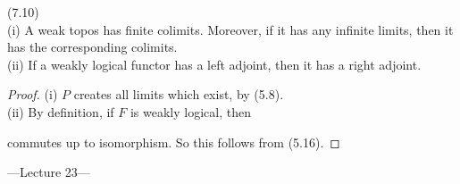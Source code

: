 \documentclass[a4paper]{article}
\begin{document}
\begin{coro} (7.10)\\
    (i) A weak topos has finite colimits. Moreover, if it has any infinite limits, then it has the corresponding colimits.\\
    (ii) If a weakly logical functor has a left adjoint, then it has a right adjoint.
    \begin{proof}
        (i) $P$ creates all limits which exist, by (5.8).\\
        (ii) By definition, if $F$ is weakly logical, then 


        commutes up to isomorphism. So this follows from (5.16).
    \end{proof}
\end{coro}

---Lecture 23---
\end{document}

